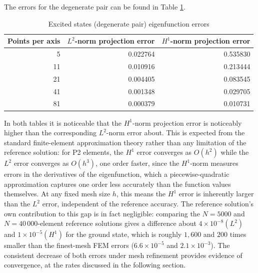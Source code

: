 \documentclass[conference]{IEEEtran}
\begin{document}
The errors for the degenerate pair can be found in Table \ref{tab:coulomb degenerate pair errors}.
\begin{table}[H]
    \centering
    \caption{Excited states (degenerate pair) eigenfunction errors}
    \label{tab:coulomb degenerate pair errors}
    \begin{tabular}{rrr}
        \toprule
        Points per axis & $L^2$-norm projection error & $H^1$-norm projection error \\
        \midrule
        5 & 0.022764 & 0.535830 \\
        11 & 0.010916 & 0.213444 \\
        21 & 0.004405 & 0.083545 \\
        41 & 0.001348 & 0.029705 \\
        81 & 0.000379 & 0.010731 \\
        \bottomrule
    \end{tabular}
\end{table}

In both tables it is noticeable that the $H^1$-norm projection error is noticeably higher than the corresponding $L^2$-norm error about. This is expected from the standard finite-element approximation theory rather than any limitation of the reference solution: for P2 elements, the $H^1$ error converges as $O(h^2)$ while the $L^2$ error converges as $O(h^3)$, one order faster, since the $H^1$-norm measures errors in the derivatives of the eigenfunction, which a piecewise-quadratic approximation captures one order less accurately than the function values themselves. At any fixed mesh size $h$, this means the $H^1$ error is inherently larger than the $L^2$ error, independent of the reference accuracy. The reference solution's own contribution to this gap is in fact negligible: comparing the $N = 5000$ and $N = 40\,000$-element reference solutions gives a difference about $4 \times 10^{-8} (L^2)$ and $1 \times 10^{-5} (H^1)$ for the ground state, which is roughly $1,600$ and $200$ times smaller than the finest-mesh FEM errors ($6.6 \times 10^{-5}$ and $2.1 \times 10^{-3}$). The consistent decrease of both errors under mesh refinement provides evidence of convergence, at the rates discussed in the following section.
\end{document}
